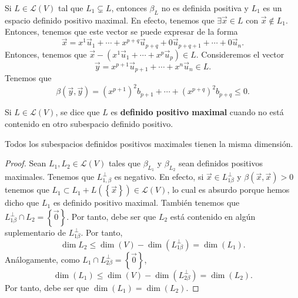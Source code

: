 \begin{observation}
\normalfont Si $\displaystyle L \in \mathcal{L}\left(V\right) $ tal que $\displaystyle L_{1} \subsetneq L $, entonces $\displaystyle \beta_{L} $ no es definida positiva y $\displaystyle L_{1} $ es un espacio definido positivo maximal. En efecto, tenemos que $\displaystyle \exists \vec{x} \in L $ con $\displaystyle \vec{x} \not\in L_{1} $. Entonces, tenemos que este vector se puede expresar de la forma
\[\vec{x} = x^{1}\vec{u}_{1} + \cdots + x^{p + q}\vec{u}_{p + q} + 0 \vec{u}_{p + q +1} + \cdots + 0\vec{u}_{n} .\]
Entonces, tenemos que $\displaystyle \vec{x}-\left(x^{1}\vec{u}_{1} + \cdots + x^{p}\vec{u}_{p}\right) \in L $. Consideremos el vector
\[ \vec{y} = x^{p +1}\vec{u}_{p +1} + \cdots + x^{n}\vec{u}_{n} \in L .\]
Tenemos que 
\[\beta\left(\vec{y},\vec{y}\right) = \left(x^{p + 1}\right)^{2}b_{p + 1} + \cdots + \left(x^{p + q}\right)^{2}b_{p + q} \leq 0 .\]
\end{observation}
\begin{fdefinition}[]
\normalfont Si $\displaystyle L \in \mathcal{L}\left(V\right) $, se dice que $\displaystyle L $ es \textbf{definido positivo maximal} cuando no está contenido en otro subespacio definido positivo.
\end{fdefinition}
\begin{ftheorem}[]
\normalfont Todos los subespacios definidos positivos maximales tienen la misma dimensión.
\end{ftheorem}
\begin{proof}
	Sean $\displaystyle L_{1}, L_{2} \in \mathcal{L}\left(V\right) $ tales que $\displaystyle \beta_{L_{1}} $ y $\displaystyle \beta_{L_{2}} $ sean definidos positivos maximales. Tenemos que $\displaystyle L^{\perp }_{1,\beta} $ es negativo. En efecto, si $\displaystyle \vec{x} \in L_{1\beta }^{\perp} $ y $\displaystyle \beta\left(\vec{x}, \vec{x}\right) > 0 $ tenemos que $\displaystyle L_{1} \subset L_{1} + L\left( \left\{ \vec{x}\right\} \right) \in \mathcal{L}\left(V\right) $, lo cual es absurdo porque hemos dicho que $\displaystyle L_{1} $ es definido positivo maximal. También tenemos que $\displaystyle L_{1\beta }^{\perp } \cap L_{2} = \left\{ \vec{0}\right\}  $. Por tanto, debe ser que $\displaystyle L_{2} $ está contenido en algún suplementario de $\displaystyle L^{\perp }_{1\beta} $. Por tanto,
	\[ \dim L_{2} \leq \dim\left(V\right)-\dim\left(L^{\perp }_{1\beta }\right) = \dim\left(L_{1}\right)  .\]
	Análogamente, como $\displaystyle L_{1} \cap L^{\perp }_{2\beta } = \left\{ \vec{0}\right\}  $,
	\[ \dim\left(L_{1}\right) \leq \dim\left(V\right) - \dim\left(L^{\perp }_{2\beta }\right) = \dim\left(L_{2}\right) .\]
Por tanto, debe ser que $\displaystyle \dim\left(L_{1}\right) = \dim\left(L_{2}\right) $.
\end{proof}
